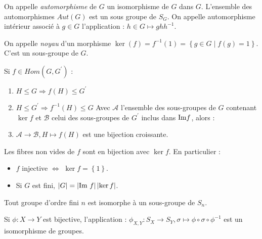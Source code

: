 \documentclass{cours}
\begin{document}
\begin{definition}
    On appelle \emph{automorphisme} de $G$ un isomorphisme de $G$ dans $G$. L'ensemble des automorphismes $Aut(G)$ est un sous groupe de $S_{G}$. On appelle automorphisme intérieur associé à $g \in G$ l'application : $h \in G \mapsto ghh^{-1}$.
\end{definition}

\begin{definition}
    On appelle \emph{noyau} d'un morphisme $\ker(f) = f^{-1}(1) = \left\{g \in G \mid f(g) = 1\right\}$. C'est un sous-groupe de $G$.
\end{definition}

\begin{proposition}
    Si $f \in Hom(G, G^{'})$ :
    \begin{enumerate}
        \item $H \leq G \Rightarrow f(H) \leq G^{'}$
        \item $H \leq G^{'} \Rightarrow f^{-1}(H) \leq G$
    Avec $\mathcal{A}$ l'ensemble des sous-groupes de $G$ contenant $\ker f$ et $\mathcal{B}$ celui des sous-groupes de $G^{'}$ inclus dans $\textmd{Im} f$, alors :
        \item $\mathcal{A} \rightarrow\mathcal{B}, H \mapsto f(H)$ est une bijection croissante. 
    \end{enumerate}
\end{proposition}

\begin{proposition}
    Les fibres non vides de $f$ sont en bijection avec $\ker f$. En particulier : 
    \begin{itemize}
        \item $f$ injective $\Leftrightarrow$ $\ker f = \left\{1\right\}$.
        \item Si $G$ est fini, $\left|G\right| = \left|\text{Im } f\right|\left|\ker f\right|$.
    \end{itemize}
\end{proposition}

\begin{theorem}[Cayley]
    Tout groupe d'ordre fini $n$ est isomorphe à un sous-groupe de $S_{n}$. 
\end{theorem}

\begin{lemma}
    Si $\phi : X \rightarrow Y$ est bijective, l'application : $\phi_{X, Y} : S_{X} \rightarrow S_{Y}, \sigma \mapsto \phi \circ \sigma \circ \phi^{-1}$ est un isomorphisme de groupes. 
\end{lemma}
\end{document}

